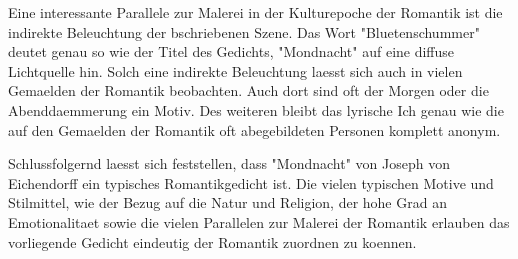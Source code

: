 \documentclass[11pt]{article}
\begin{document}
Eine interessante Parallele zur Malerei in der Kulturepoche der Romantik ist die indirekte Beleuchtung der bschriebenen Szene. Das Wort "Bluetenschummer" deutet genau so wie der Titel des Gedichts, "Mondnacht" auf eine diffuse Lichtquelle hin. Solch eine indirekte Beleuchtung laesst sich auch in vielen Gemaelden der Romantik beobachten. Auch dort sind oft der Morgen oder die Abenddaemmerung ein Motiv. Des weiteren bleibt das lyrische Ich genau wie die auf den Gemaelden der Romantik oft abegebildeten Personen komplett anonym.

Schlussfolgernd laesst sich feststellen, dass "Mondnacht" von Joseph von Eichendorff ein typisches Romantikgedicht ist. Die vielen typischen Motive und Stilmittel, wie der Bezug auf die Natur und Religion, der hohe Grad an Emotionalitaet sowie die vielen Parallelen zur Malerei der Romantik erlauben das vorliegende Gedicht eindeutig der Romantik zuordnen zu koennen.
\end{document}
